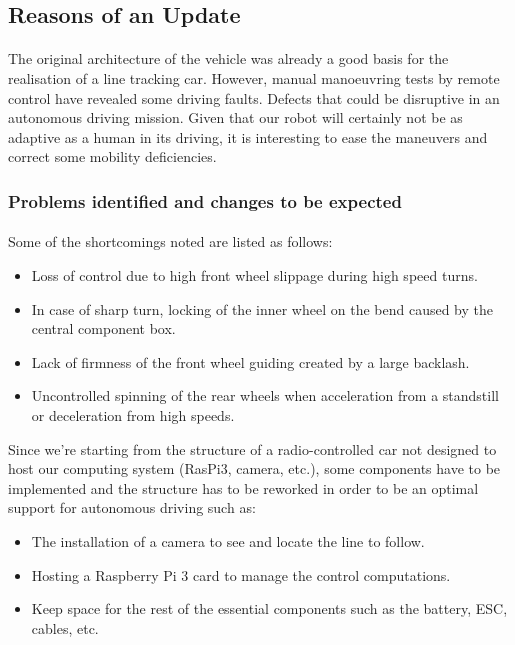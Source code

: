 \subsection{Reasons of an Update}
\paragraph{}
The original architecture of the vehicle was already a good basis for the
realisation of a line tracking car. However, manual manoeuvring tests by
remote control have revealed some driving faults. Defects that could be
disruptive in an autonomous driving mission. Given that our robot
will certainly not be as adaptive as a human in its driving, it is
interesting to ease the maneuvers and correct some mobility deficiencies.

\subsubsection{Problems identified and changes to be expected}
\paragraph{}
Some of the shortcomings noted are listed as follows:
\begin{itemize}
    \item Loss of control due to high front wheel slippage during high speed turns.
    \item In case of sharp turn, locking of the inner wheel on the bend caused by
    the central component box.
    \item Lack of firmness of the front wheel guiding created by a large backlash.
    \item Uncontrolled spinning of the rear wheels when acceleration from a
    standstill or deceleration from high speeds.
\end{itemize}
Since we're starting from the structure of a radio-controlled car not designed to host our computing system (RasPi3, camera, etc.), some components have to be implemented and the structure has to be reworked in order to be an optimal support for autonomous driving such as:
\begin{itemize}
    \item The installation of a camera to see and locate the line to follow.
    \item Hosting a Raspberry Pi 3 card to manage the control computations.
    \item Keep space for the rest of the essential components such as the battery,
    ESC, cables, etc.
\end{itemize}

